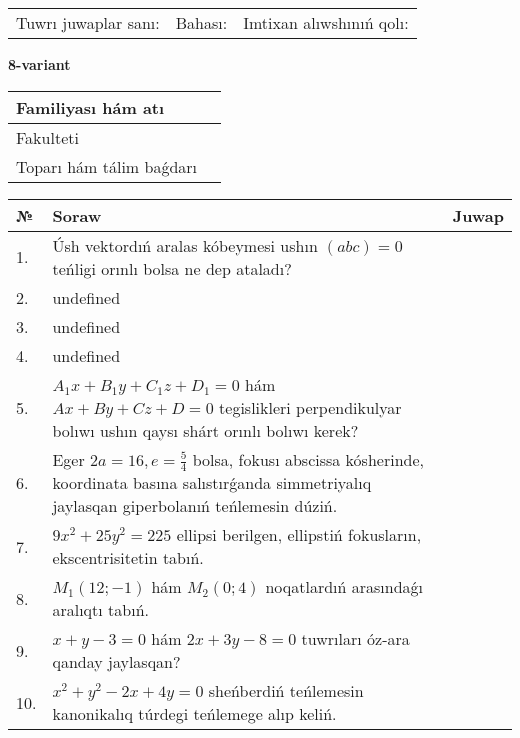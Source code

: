 \documentclass{article}
\begin{document}
\vspace{0.7cm}

\begin{tabular}{lll}
Tuwrı juwaplar sanı: \underline{\hspace{1cm}} & 
Bahası: \underline{\hspace{1cm}} & 
Imtixan alıwshınıń qolı: \underline{\hspace{2cm}} \\
\end{tabular}

\egroup

\newpage


\textbf{8-variant}\\

\bgroup
\def\arraystretch{1.6} %

\begin{tabular}{|m{5.7cm}|m{9.5cm}|}
\hline
Familiyası hám atı & \\
\hline
Fakulteti  & \\
\hline
Toparı hám tálim baǵdarı  & \\
\hline
\end{tabular}

\vspace{0.7cm}

\begin{tabular}{|m{0.7cm}|m{10cm}|m{4cm}|}
\hline
№ & Soraw & Juwap \\
\hline
1. & Úsh vektordıń aralas kóbeymesi ushın \((abc) = 0\) teńligi orınlı bolsa ne dep ataladı? &  \\
\hline
2. & undefined &  \\
\hline
3. & undefined &  \\
\hline
4. & undefined &  \\
\hline
5. & \(A_{1}x + B_{1}y + C_{1}z + D_{1} = 0\) hám \(Ax + By + Cz + D = 0\) tegislikleri perpendikulyar bolıwı ushın qaysı shárt orınlı bolıwı kerek? &  \\
\hline
6. & Eger \(2 a = 16, e = \frac{5}{4}\) bolsa, fokusı abscissa kósherinde, koordinata basına salıstırǵanda simmetriyalıq jaylasqan giperbolanıń teńlemesin dúziń. &  \\
\hline
7. & \(9 x^{2} + 25 y^{2} = 225\) ellipsi berilgen, ellipstiń fokusların, ekscentrisitetin tabıń. &  \\
\hline
8. & \(M_{1} (12; - 1)\) hám \(M_{2} (0;4)\) noqatlardıń arasındaǵı aralıqtı tabıń. &  \\
\hline
9. & \(x + y - 3 = 0\) hám \(2 x + 3 y - 8 = 0\) tuwrıları óz-ara qanday jaylasqan? &  \\
\hline
10. & \(x^{2} + y^{2} - 2 x + 4 y = 0\) sheńberdiń teńlemesin kanonikalıq túrdegi teńlemege alıp keliń. & \\
\hline
\end{tabular}
\end{document}
